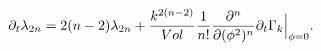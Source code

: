 \begin{equation}
\partial_t \lambda_{2n}=
2(n-2)\lambda_{2n}+{k^{2(n-2)}\over Vol}{1\over n!}
{\partial^n\over\partial (\phi^2)^n}\partial_t \Gamma_k \Big|_{\phi=0}.
\end{equation}

